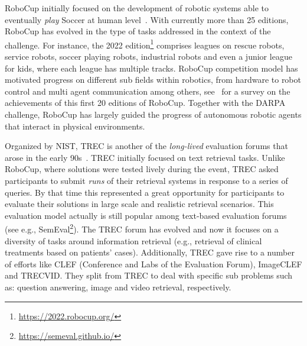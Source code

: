 \documentclass[twoside,11pt]{article}
\begin{document}
RoboCup initially focused on the development of robotic systems able to eventually \emph{play} Soccer at human level~\citep{robocup1}. With currently more than 25 editions, %
RoboCup has evolved in the type of tasks addressed in the context of the challenge. For instance, the 2022 edition\footnote{\url{https://2022.robocup.org/}} comprises leagues on rescue robots, service robots,  soccer playing robots, industrial robots and even a junior league for kids, where each league has multiple tracks. RoboCup competition model has motivated progress on different sub fields within robotics, from hardware to robot control and multi agent communication among others, see~\citep{DBLP:journals/ki/Visser16a}  for a survey on the achievements of this first 20 editions of RoboCup. Together with the DARPA challenge, RoboCup has largely guided the progress of autonomous robotic agents that interact in physical environments.   

Organized by  NIST, TREC is another of the \emph{long-lived} evaluation forums that arose in the early 90s~\citep{trec93}. TREC initially focused on text retrieval tasks. Unlike RoboCup, where solutions were tested lively during the event, TREC asked participants to submit \emph{runs} of their retrieval systems in response to a series of queries. By that time this represented a great opportunity for participants to evaluate their solutions in large scale and realistic retrieval scenarios. This evaluation model actually is still popular among text-based evaluation forums (see e.g., SemEval\footnote{\url{https://semeval.github.io/}}). The TREC forum has evolved and now it focuses on a diversity of tasks around information retrieval (e.g., retrieval of clinical treatments based on patients' cases). Additionally, TREC gave rise to a number of efforts like CLEF (Conference and Labs of the Evaluation Forum), ImageCLEF and TRECVID. They split from TREC to deal with specific sub problems such as: question answering, image and video retrieval, respectively.   %

\end{document}
